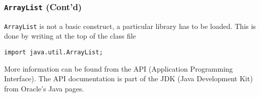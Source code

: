 \documentclass{beamer}
\def\mcolor#1#2{\rule{0ex}{0ex}\color{#1}#2\color{black}{}}
\begin{document}
\begin{frame}
\frametitle{\texttt{ArrayList} (Cont'd)}
  \texttt{ArrayList} is not a basic construct, a particular library
  has to be loaded. This is done by writing at the top of the class file

\mcolor{blue}{\texttt{import java.util.ArrayList;}}

More information can be found from the API (Application Programming
Interface).  The API documentation is part of the JDK (Java
Development Kit) from Oracle's Java pages.
\end{frame}
\end{document}
